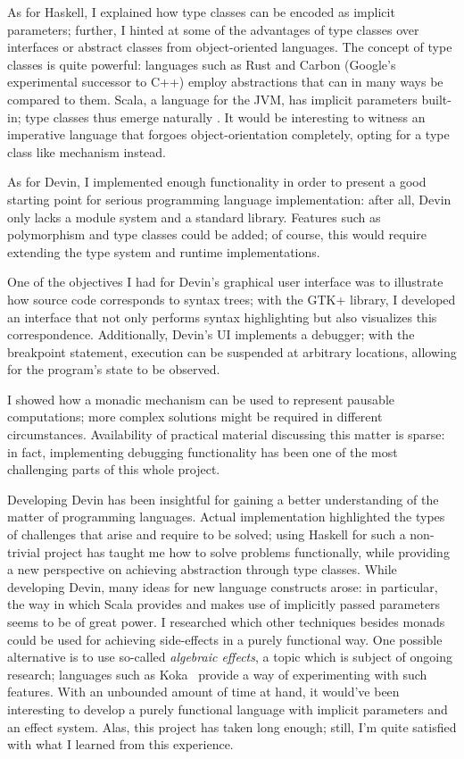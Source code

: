 \documentclass[UdineBachThesis,american,11pt]{PhdThesis}
\begin{document}
  As for Haskell, I explained how type classes can be encoded as implicit
  parameters; further, I hinted at some of the advantages of type classes over
  interfaces or abstract classes from object-oriented languages. The concept of
  type classes is quite powerful: languages such as Rust and Carbon (Google's
  experimental successor to C++) employ abstractions that can in many ways be
  compared to them. Scala, a language for the JVM, has implicit parameters
  built-in; type classes thus emerge naturally \cite{scala-type-classes}. It
  would be interesting to witness an imperative language that forgoes
  object-orientation completely, opting for a type class like mechanism instead.

  As for Devin, I implemented enough functionality in order to present a good
  starting point for serious programming language implementation: after all,
  Devin only lacks a module system and a standard library. Features such as
  polymorphism and type classes could be added; of course, this would require
  extending the type system and runtime implementations.

  One of the objectives I had for Devin's graphical user interface was to
  illustrate how source code corresponds to syntax trees; with the GTK+ library,
  I developed an interface that not only performs syntax highlighting but also
  visualizes this correspondence. Additionally, Devin's UI implements a
  debugger; with the breakpoint statement, execution can be suspended at
  arbitrary locations, allowing for the program's state to be observed.

  I showed how a monadic mechanism can be used to represent pausable
  computations; more complex solutions might be required in different
  circumstances. Availability of practical material discussing this matter is
  sparse: in fact, implementing debugging functionality has been one of the most
  challenging parts of this whole project.

  Developing Devin has been insightful for gaining a better understanding of the
  matter of programming languages. Actual implementation highlighted the types
  of challenges that arise and require to be solved; using Haskell for such a
  non-trivial project has taught me how to solve problems functionally, while
  providing a new perspective on achieving abstraction through type classes.
  While developing Devin, many ideas for new language constructs arose: in
  particular, the way in which Scala provides and makes use of implicitly passed
  parameters seems to be of great power. I researched which other techniques
  besides monads could be used for achieving side-effects in a purely functional
  way. One possible alternative is to use so-called \emph{algebraic effects}, a
  topic which is subject of ongoing research; languages such as Koka~\cite{koka}
  provide a way of experimenting with such features. With an unbounded amount of
  time at hand, it would've been interesting to develop a purely functional
  language with implicit parameters and an effect system. Alas, this project has
  taken long enough; still, I'm quite satisfied with what I learned from this
  experience.
\end{document}
